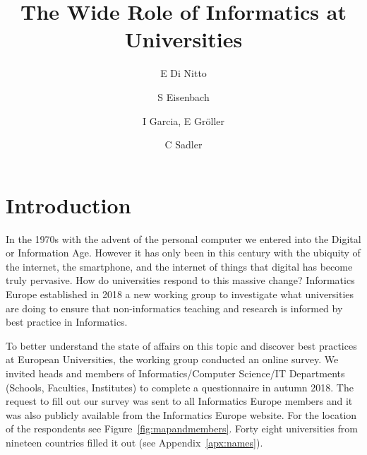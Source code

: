 \documentclass[11pt]{amsart}
\title{The Wide Role of Informatics at Universities}
\author{E Di Nitto \and S Eisenbach \and I Garcia, E Gr\"{o}ller \and C Sadler}
\begin{document}
\maketitle
\section{Introduction}

In the 1970s with the advent of the personal computer we entered into the Digital or Information Age. However it has only been in this century with the ubiquity of the internet, the smartphone, and the internet of things that digital has become truly pervasive. How do universities respond to this massive change? Informatics Europe established in 2018 a new working group to investigate what universities are doing to ensure that non-informatics teaching and research is informed by best practice in Informatics.

To better understand the state of affairs on this topic and discover best practices at European Universities, the working group conducted an online survey. We invited heads and members of Informatics/Computer Science/IT Departments (Schools, Faculties, Institutes) to complete a questionnaire in autumn 2018. The request to fill out our survey was sent to all Informatics Europe members and it was also publicly available from the Informatics Europe website.  For the location of the respondents see Figure~\ref{fig:mapandmembers}.  Forty eight universities from nineteen countries filled it out (see Appendix~\ref{apx:names}).
\end{document}
